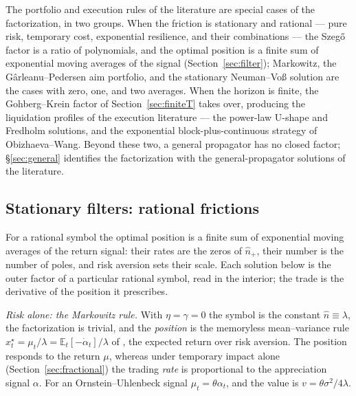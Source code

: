 \documentclass[11pt]{article}
\newcommand{\E}{\mathbb{E}}
\theoremstyle{plain}
\theoremstyle{definition}
\theoremstyle{remark}
\begin{document}
The portfolio and execution rules of the literature are special cases of the factorization, in two groups. When the friction is stationary and rational --- pure risk, temporary cost, exponential resilience, and their combinations --- the Szeg\H{o} factor is a ratio of polynomials, and the optimal position is a finite sum of exponential moving averages of the signal (Section~\ref{sec:filter}); Markowitz, the G\^arleanu--Pedersen aim portfolio, and the stationary Neuman--Vo\ss{} solution are the cases with zero, one, and two averages. When the horizon is finite, the Gohberg--Krein factor of Section~\ref{sec:finiteT} takes over, producing the liquidation profiles of the execution literature --- the power-law U-shape and Fredholm solutions, and the exponential block-plus-continuous strategy of Obizhaeva--Wang. Beyond these two, a general propagator has no closed factor; \S\ref{sec:general} identifies the factorization with the general-propagator solutions of the literature.

\subsection{Stationary filters: rational frictions}\label{sec:rational}

For a rational symbol the optimal position is a finite sum of exponential moving averages of the return signal: their rates are the zeros of $\hat n_+$, their number is the number of poles, and risk aversion sets their scale. Each solution below is the outer factor of a particular rational symbol, read in the interior; the trade is the derivative of the position it prescribes.

\emph{Risk alone: the Markowitz rule.} With $\eta=\gamma=0$ the symbol is the constant $\hat n\equiv\lambda$, the factorization is trivial, and the \emph{position} is the memoryless mean--variance rule $x^\star_t=\mu_t/\lambda=\E_t[-\dot\alpha_t]/\lambda$ of \citet{Markowitz1952,Merton1971}, the expected return over risk aversion. The position responds to the return $\mu$, whereas under temporary impact alone (Section~\ref{sec:fractional}) the trading \emph{rate} is proportional to the appreciation signal $\alpha$. For an Ornstein--Uhlenbeck signal $\mu_t=\theta\alpha_t$, and the value is $v=\theta\sigma^2/4\lambda$.
\end{document}
